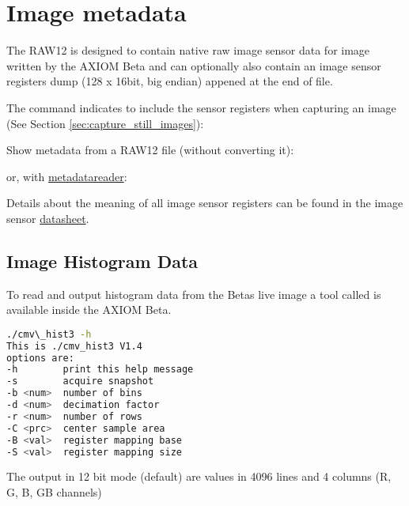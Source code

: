 \section{Image metadata}
The RAW12 is designed to contain native raw image sensor data for image written by the AXIOM Beta and can optionally also contain an image sensor registers dump (128 x 16bit, big endian) appened at the end of file.  

The  command indicates to include the sensor registers when capturing an image (See Section \ref{sec:capture_still_images}):

Show metadata from a RAW12 file (without converting it):


or, with \href{https://github.com/apertus-open-source-cinema/misc-tools-utilities/tree/master/cmv12000-metadata-reader}{metadatareader}:


Details about the meaning of all image sensor registers can be found in the image sensor  \href{https://github.com/apertus-open-source-cinema/beta-hardware/tree/master/Datasheets}{datasheet}. 

\subsection{Image Histogram Data}

To read and output histogram data from the Betas live image a tool called  is available inside the AXIOM Beta.

\begin{lstlisting}[language=bash,morekeywords=$,keywordstyle=\bfseries,frame=none,xleftmargin=.25in,belowskip=2em]
./cmv\_hist3 -h                                                   
This is ./cmv_hist3 V1.4                                                        
options are:                                                                    
-h        print this help message                                               
-s        acquire snapshot                                                      
-b <num>  number of bins                                                        
-d <num>  decimation factor                                                     
-r <num>  number of rows                                                        
-C <prc>  center sample area                                                    
-B <val>  register mapping base                                                 
-S <val>  register mapping size
\end{lstlisting}

The output in 12 bit mode (default) are values in 4096 lines and 4 columns (R, G, B, GB channels) 